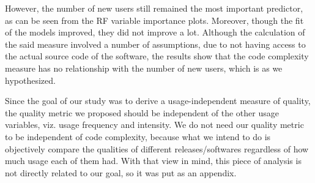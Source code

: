 \documentclass[smallcondensed]{svjour3}     %
\begin{document}
However, the number of new users still remained the most important predictor, as can be seen from the RF variable importance plots. Moreover, though the fit of the models improved, they did not improve a lot. Although the calculation of the said measure involved a number of assumptions, due to not having access to the actual source code of the software, the results show that the code complexity measure has no relationship with the number of new users, which is as we hypothesized. 

Since the goal of our study was to derive a usage-independent measure of quality, the quality metric we proposed should be independent of the other usage variables, viz. usage frequency and intensity. We do not need our quality metric to be independent of code complexity, because what we intend to do is objectively compare the qualities of different releases/softwares regardless of how much usage each of them had. With that view in mind, this piece of analysis is not directly related to our goal, so it was put as an appendix.
\end{document}
